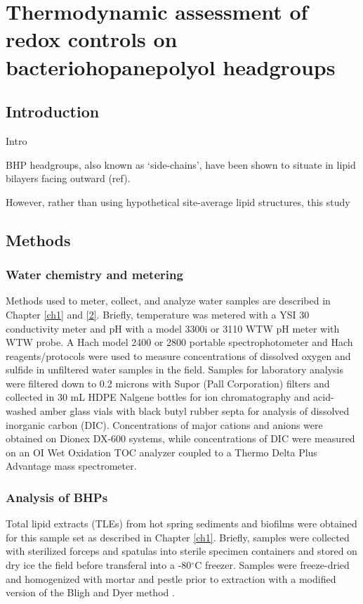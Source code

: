 \chapter{Thermodynamic assessment of redox controls on bacteriohopanepolyol headgroups}\label{ch3}


\section{Introduction}
Intro

BHP headgroups, also known as `side-chains', have been shown to situate in lipid bilayers facing outward (ref).


However, rather than using hypothetical site-average lipid structures, this study 

\section{Methods}

\subsection{Water chemistry and metering}
Methods used to meter, collect, and analyze water samples are described in Chapter \ref{ch1} and \ref{2}. Briefly, temperature was metered with a YSI 30 conductivity meter and pH with a model 3300i or 3110 WTW pH meter with WTW probe. A Hach model 2400 or 2800 portable spectrophotometer and Hach reagents/protocols were used to measure concentrations of dissolved oxygen and sulfide in unfiltered water samples in the field. Samples for laboratory analysis were filtered down to 0.2 microns with Supor (Pall Corporation) filters and collected in 30 mL HDPE Nalgene bottles for ion chromatography and acid-washed amber glass vials with black butyl rubber septa for analysis of dissolved inorganic carbon (DIC). Concentrations of major cations and anions were obtained on Dionex DX-600 systems, while concentrations of DIC were measured on an OI Wet Oxidation TOC analyzer coupled to a Thermo Delta Plus Advantage mass spectrometer.

\subsection{Analysis of BHPs} Total lipid extracts (TLEs) from hot spring sediments and biofilms were obtained for this sample set as described in Chapter \ref{ch1}. Briefly, samples were collected with sterilized forceps and spatulas into sterile specimen containers and stored on dry ice the field before transferal into a -80$^{\circ}$C freezer. Samples were freeze-dried and homogenized with mortar and pestle prior to extraction with a modified version of the Bligh and Dyer method \citep{white1998signature}.

